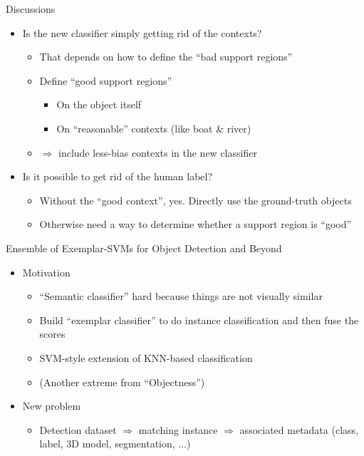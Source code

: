 \documentclass[12pt]{beamer}
\begin{document}
\begin{frame}{Discussions}
    \begin{itemize}
        \item Is the new classifier simply getting rid of the contexts?
        \begin{itemize}
            \item That depends on how to define the ``bad support regions''
            \item Define ``good support regions''
            \begin{itemize}
                \item On the object itself
                \item On ``reasonable'' contexts (like boat & river)
            \end{itemize}
            \item $\Rightarrow$ include less-bias contexts in the new classifier
        \end{itemize}
        \item Is it possible to get rid of the human label?
        \begin{itemize}
            \item Without the ``good context'', yes. Directly use the ground-truth objects
            \item Otherwise need a way to determine whether a support region is ``good''
        \end{itemize}
    \end{itemize}
\end{frame}

\begin{frame}{Ensemble of Exemplar-SVMs for Object Detection and Beyond}
	\begin{itemize}
		\item Motivation
		\begin{itemize}
			\item ``Semantic classifier'' hard because things are not visually similar
			\item Build ``exemplar classifier'' to do instance classification and then fuse the scores
			\item SVM-style extension of KNN-based classification
            \item (Another extreme from ``Objectness'')
		\end{itemize}
		\item New problem
		\begin{itemize}
			\item Detection dataset $\Rightarrow$ matching instance $\Rightarrow$ associated metadata (class, label, 3D model, segmentation, ...)
		\end{itemize}
	\end{itemize}
\end{frame}
\end{document}
